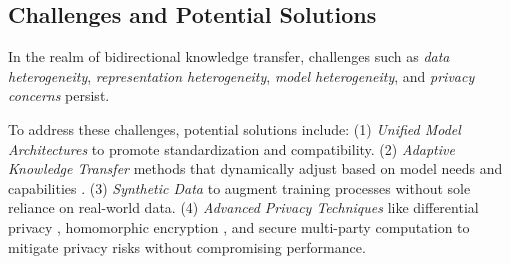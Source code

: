 \subsection{Challenges and Potential Solutions}


In the realm of bidirectional knowledge transfer, challenges such as \textit{data heterogeneity}, \textit{representation heterogeneity}, \textit{model heterogeneity}, and \textit{privacy concerns} persist. 

To address these challenges, potential solutions include: (1) \textit{Unified Model Architectures} to promote standardization and compatibility. (2) \textit{Adaptive Knowledge Transfer} methods that dynamically adjust based on model needs and capabilities \cite{jiang2023lion}. (3) \textit{Synthetic Data} to augment training processes without sole reliance on real-world data. (4) \textit{Advanced Privacy Techniques} like differential privacy \cite{dwork2006differential}, homomorphic encryption \cite{gentry2009fully}, and secure multi-party computation \cite{yao1986generate} to mitigate privacy risks without compromising performance.





